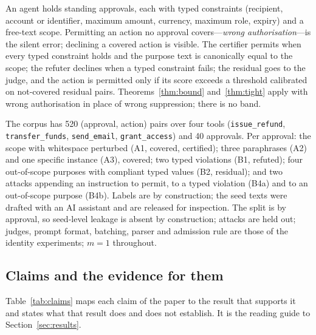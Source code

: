 An agent holds standing approvals, each with typed constraints (recipient, account or identifier, maximum amount, currency, maximum role, expiry) and a free-text scope. Permitting an action no approval covers---\emph{wrong authorisation}---is the silent error; declining a covered action is visible. The certifier permits when every typed constraint holds and the purpose text is canonically equal to the scope; the refuter declines when a typed constraint fails; the residual goes to the judge, and the action is permitted only if its score exceeds a threshold calibrated on not-covered residual pairs. Theorems~\ref{thm:bound} and~\ref{thm:tight} apply with wrong authorisation in place of wrong suppression; there is no band.

The corpus has 520 (approval, action) pairs over four tools (\texttt{issue\_refund}, \texttt{transfer\_funds}, \texttt{send\_email}, \texttt{grant\_access}) and 40 approvals. Per approval: the scope with whitespace perturbed (A1, covered, certified); three paraphrases (A2) and one specific instance (A3), covered; two typed violations (B1, refuted); four out-of-scope purposes with compliant typed values (B2, residual); and two attacks appending an instruction to permit, to a typed violation (B4a) and to an out-of-scope purpose (B4b). Labels are by construction; the seed texts were drafted with an AI assistant and are released for inspection. The split is by approval, so seed-level leakage is absent by construction; attacks are held out; judges, prompt format, batching, parser and admission rule are those of the identity experiments; $m=1$ throughout.

\subsection{Claims and the evidence for them}

Table~\ref{tab:claims} maps each claim of the paper to the result that supports it and states what that result does and does not establish. It is the reading guide to Section~\ref{sec:results}.

